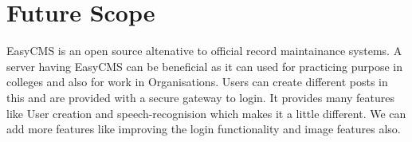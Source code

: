 
\section{Future Scope}
EasyCMS is an open source altenative to official record maintainance systems.
  A server having EasyCMS can be beneficial as it can used for practicing purpose in colleges and also for work in Organisations. Users can create different posts in this and are provided with a secure gateway to login. It provides many features like User creation and speech-recognision which makes it a little different.
We can add more features like improving the login functionality and image features also.



